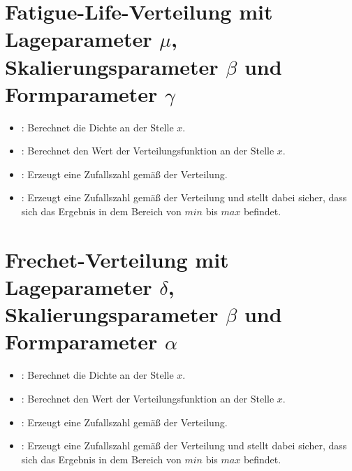 \section{Fatigue-Life-Verteilung mit Lageparameter \texorpdfstring{$\mu$}{mu}, Skalierungsparameter \texorpdfstring{$\beta$}{beta} und Formparameter \texorpdfstring{$\gamma$}{gamma}}

\begin{itemize}

\item
{}:
Berechnet die Dichte an der Stelle $x$.

\item
{}:
Berechnet den Wert der Verteilungsfunktion an der Stelle $x$.

\item
{}:
Erzeugt eine Zufallszahl gemäß der Verteilung.

\item
{}:
Erzeugt eine Zufallszahl gemäß der Verteilung und stellt dabei sicher, dass sich das Ergebnis in dem Bereich von $min$ bis $max$ befindet.

\end{itemize}



\section{Frechet-Verteilung mit Lageparameter \texorpdfstring{$\delta$}{delta}, Skalierungsparameter \texorpdfstring{$\beta$}{beta} und Formparameter \texorpdfstring{$\alpha$}{alpha}}

\begin{itemize}

\item
{}:
Berechnet die Dichte an der Stelle $x$.

\item
{}:
Berechnet den Wert der Verteilungsfunktion an der Stelle $x$.

\item
{}:
Erzeugt eine Zufallszahl gemäß der Verteilung.

\item
{}:
Erzeugt eine Zufallszahl gemäß der Verteilung und stellt dabei sicher, dass sich das Ergebnis in dem Bereich von $min$ bis $max$ befindet.

\end{itemize}



